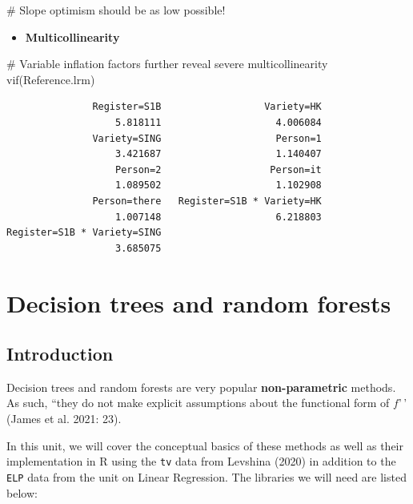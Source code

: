 \documentclass[
  11pt,
  letterpaper,
  DIV=11,
  numbers=noendperiod]{scrreprt}
\newenvironment{Shaded}{\begin{snugshade}}{\end{snugshade}}
\newcommand{\CommentTok}[1]{\textcolor[rgb]{0.37,0.37,0.37}{#1}}
\newcommand{\FunctionTok}[1]{\textcolor[rgb]{0.28,0.35,0.67}{#1}}
\newcommand{\NormalTok}[1]{\textcolor[rgb]{0.00,0.23,0.31}{#1}}
\providecommand{\tightlist}{%
  \setlength{\itemsep}{0pt}\setlength{\parskip}{0pt}}\usepackage{longtable,booktabs,array}
\begin{document}
\begin{Shaded}
\begin{Highlighting}[]
\CommentTok{\# Slope optimism should be as low possible!}
\end{Highlighting}
\end{Shaded}

\begin{itemize}
\tightlist
\item
  \textbf{Multicollinearity}
\end{itemize}

\begin{Shaded}
\begin{Highlighting}[]
\CommentTok{\# Variable inflation factors further reveal severe multicollinearity}
\FunctionTok{vif}\NormalTok{(Reference.lrm)}
\end{Highlighting}
\end{Shaded}

\begin{verbatim}
               Register=S1B                  Variety=HK 
                   5.818111                    4.006084 
               Variety=SING                    Person=1 
                   3.421687                    1.140407 
                   Person=2                   Person=it 
                   1.089502                    1.102908 
               Person=there   Register=S1B * Variety=HK 
                   1.007148                    6.218803 
Register=S1B * Variety=SING 
                   3.685075 
\end{verbatim}

\chapter{Decision trees and random
forests}\label{decision-trees-and-random-forests}

\section{Introduction}\label{introduction-1}

Decision trees and random forests are very popular
\textbf{non-parametric} methods. As such, ``they do not make explicit
assumptions about the functional form of \(f\)'\,' (James et al. 2021:
23).

In this unit, we will cover the conceptual basics of these methods as
well as their implementation in R using the \texttt{tv} data from
Levshina (2020) in addition to the \texttt{ELP} data from the unit on
Linear Regression. The libraries we will need are listed below:
\end{document}
